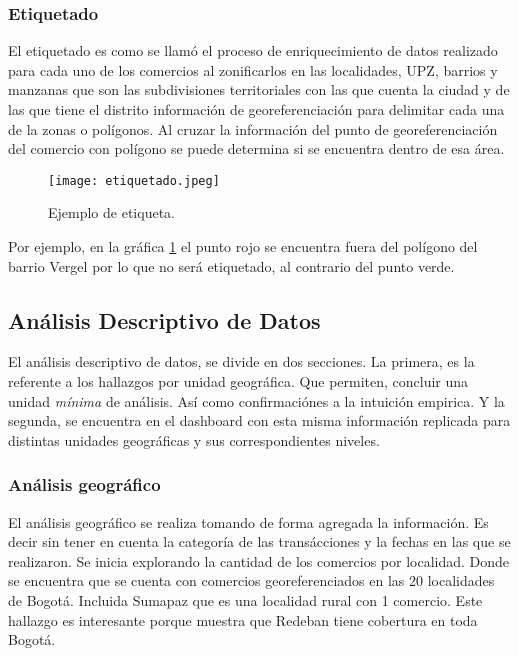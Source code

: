 \documentclass[a4paper]{article}
\begin{document}
\subsubsection{Etiquetado}

El etiquetado es como se llamó el proceso de enriquecimiento de datos realizado para cada uno de los comercios al zonificarlos en las localidades, UPZ, barrios y manzanas que son las subdivisiones territoriales con las que cuenta la ciudad y de las que tiene el distrito información de georeferenciación para delimitar cada una de la zonas o polígonos. Al cruzar la información del punto de georeferenciación del comercio con polígono se puede determina si se encuentra dentro de esa área.

\begin{figure}[h]
    \centering
	\texttt{[image: etiquetado.jpeg]}
    \caption{Ejemplo de etiqueta.}
    \label{fig:etiquetado}
\end{figure}


Por ejemplo, en la gráfica \ref{fig:etiquetado} el punto rojo se encuentra fuera del polígono del barrio Vergel por lo que no será etiquetado, al contrario del punto verde.

\subsection{Análisis Descriptivo de Datos}

El análisis descriptivo de datos, se divide en dos secciones. La primera, es la referente a los hallazgos por unidad geográfica. Que permiten,
concluir una unidad \textit{mínima} de análisis. Así como confirmaciónes a la intuición empirica. Y la segunda, se encuentra en el dashboard con
esta misma información replicada para distintas unidades geográficas y sus correspondientes niveles.

\subsubsection{Análisis geográfico}

El análisis geográfico se realiza tomando de forma agregada la información. Es decir sin tener en cuenta la categoría de las transácciones y la fechas en las que se realizaron. Se inicia explorando la cantidad de los comercios por localidad. Donde se encuentra que se cuenta con comercios georeferenciados en las 20 localidades de Bogotá. Incluida Sumapaz que es una localidad rural con 1 comercio. Este hallazgo es interesante porque muestra que Redeban tiene cobertura en toda Bogotá.
\end{document}
